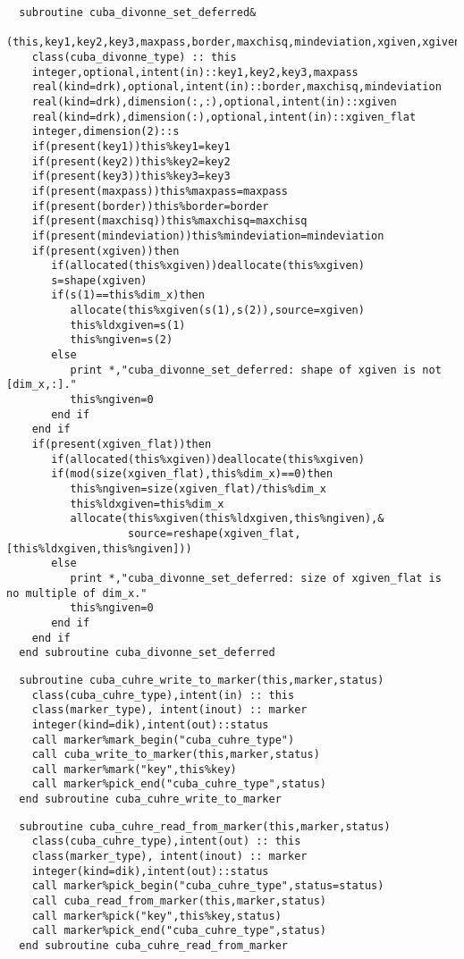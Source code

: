 \begin{Verbatim}
  subroutine cuba_divonne_set_deferred&
    (this,key1,key2,key3,maxpass,border,maxchisq,mindeviation,xgiven,xgiven_flat)
    class(cuba_divonne_type) :: this
    integer,optional,intent(in)::key1,key2,key3,maxpass
    real(kind=drk),optional,intent(in)::border,maxchisq,mindeviation
    real(kind=drk),dimension(:,:),optional,intent(in)::xgiven
    real(kind=drk),dimension(:),optional,intent(in)::xgiven_flat
    integer,dimension(2)::s
    if(present(key1))this%key1=key1
    if(present(key2))this%key2=key2
    if(present(key3))this%key3=key3
    if(present(maxpass))this%maxpass=maxpass
    if(present(border))this%border=border
    if(present(maxchisq))this%maxchisq=maxchisq
    if(present(mindeviation))this%mindeviation=mindeviation
    if(present(xgiven))then
       if(allocated(this%xgiven))deallocate(this%xgiven)
       s=shape(xgiven)
       if(s(1)==this%dim_x)then
          allocate(this%xgiven(s(1),s(2)),source=xgiven)
          this%ldxgiven=s(1)
          this%ngiven=s(2)
       else
          print *,"cuba_divonne_set_deferred: shape of xgiven is not [dim_x,:]."
          this%ngiven=0
       end if
    end if
    if(present(xgiven_flat))then
       if(allocated(this%xgiven))deallocate(this%xgiven)
       if(mod(size(xgiven_flat),this%dim_x)==0)then
          this%ngiven=size(xgiven_flat)/this%dim_x
          this%ldxgiven=this%dim_x
          allocate(this%xgiven(this%ldxgiven,this%ngiven),&
                   source=reshape(xgiven_flat,[this%ldxgiven,this%ngiven]))
       else
          print *,"cuba_divonne_set_deferred: size of xgiven_flat is no multiple of dim_x."
          this%ngiven=0
       end if
    end if
  end subroutine cuba_divonne_set_deferred
\end{Verbatim}

\begin{Verbatim}
  subroutine cuba_cuhre_write_to_marker(this,marker,status)
    class(cuba_cuhre_type),intent(in) :: this
    class(marker_type), intent(inout) :: marker
    integer(kind=dik),intent(out)::status
    call marker%mark_begin("cuba_cuhre_type")
    call cuba_write_to_marker(this,marker,status)
    call marker%mark("key",this%key)
    call marker%pick_end("cuba_cuhre_type",status)
  end subroutine cuba_cuhre_write_to_marker
\end{Verbatim}

\begin{Verbatim}
  subroutine cuba_cuhre_read_from_marker(this,marker,status)
    class(cuba_cuhre_type),intent(out) :: this
    class(marker_type), intent(inout) :: marker
    integer(kind=dik),intent(out)::status
    call marker%pick_begin("cuba_cuhre_type",status=status)
    call cuba_read_from_marker(this,marker,status)
    call marker%pick("key",this%key,status)
    call marker%pick_end("cuba_cuhre_type",status)
  end subroutine cuba_cuhre_read_from_marker
\end{Verbatim}

